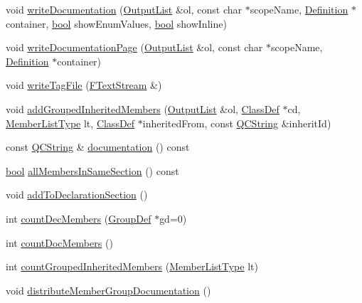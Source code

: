\begin{DoxyCompactItemize}
\item 
void \hyperlink{class_member_group_a7410bdf400070581fae0d9b0846fe3a2}{write\+Documentation} (\hyperlink{class_output_list}{Output\+List} \&ol, const char $\ast$scope\+Name, \hyperlink{class_definition}{Definition} $\ast$container, \hyperlink{qglobal_8h_a1062901a7428fdd9c7f180f5e01ea056}{bool} show\+Enum\+Values, \hyperlink{qglobal_8h_a1062901a7428fdd9c7f180f5e01ea056}{bool} show\+Inline)
\item 
void \hyperlink{class_member_group_a16fd2d2ddba7e35f4e0ed5bab6172d57}{write\+Documentation\+Page} (\hyperlink{class_output_list}{Output\+List} \&ol, const char $\ast$scope\+Name, \hyperlink{class_definition}{Definition} $\ast$container)
\item 
void \hyperlink{class_member_group_adb184ead64edfd054cb47c15e4a5b89e}{write\+Tag\+File} (\hyperlink{class_f_text_stream}{F\+Text\+Stream} \&)
\item 
void \hyperlink{class_member_group_aa9798fce83c8c660e4413dc7f12a41fa}{add\+Grouped\+Inherited\+Members} (\hyperlink{class_output_list}{Output\+List} \&ol, \hyperlink{class_class_def}{Class\+Def} $\ast$cd, \hyperlink{types_8h_abe8ad5992f8938a28f918f51b199aa19}{Member\+List\+Type} lt, \hyperlink{class_class_def}{Class\+Def} $\ast$inherited\+From, const \hyperlink{class_q_c_string}{Q\+C\+String} \&inherit\+Id)
\item 
const \hyperlink{class_q_c_string}{Q\+C\+String} \& \hyperlink{class_member_group_ad74bdf9b4429b43e775947d84d3b12a9}{documentation} () const 
\item 
\hyperlink{qglobal_8h_a1062901a7428fdd9c7f180f5e01ea056}{bool} \hyperlink{class_member_group_ae23b43794b11d7329a16cd3125e0b876}{all\+Members\+In\+Same\+Section} () const 
\item 
void \hyperlink{class_member_group_a1dc30e752b0c36ee2be1716ff8d83856}{add\+To\+Declaration\+Section} ()
\item 
int \hyperlink{class_member_group_a36f705d27aff743dd93c3d69b9afc74b}{count\+Dec\+Members} (\hyperlink{class_group_def}{Group\+Def} $\ast$gd=0)
\item 
int \hyperlink{class_member_group_ac6a226c5fa7a4458e4fd7bc1be86665a}{count\+Doc\+Members} ()
\item 
int \hyperlink{class_member_group_a9134204269c78e233a4160a10653a04f}{count\+Grouped\+Inherited\+Members} (\hyperlink{types_8h_abe8ad5992f8938a28f918f51b199aa19}{Member\+List\+Type} lt)
\item 
void \hyperlink{class_member_group_a7814e5796402b44a7ee813a2bd5c23eb}{distribute\+Member\+Group\+Documentation} ()

\end{DoxyCompactItemize}
